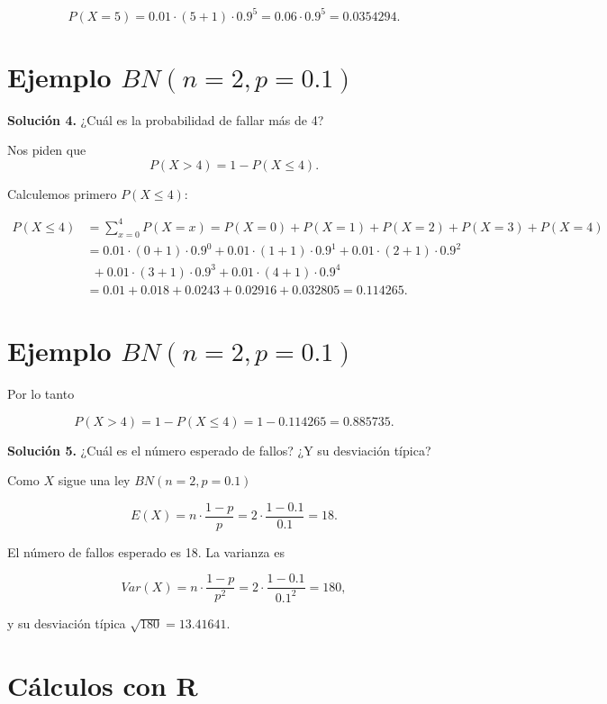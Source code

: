 \documentclass[
  letterpaper,
  DIV=11,
  numbers=noendperiod]{scrreprt}
\begin{document}
\[
P(X=5)= 0.01\cdot (5+1) \cdot 0.9^{5}= 0.06 \cdot 0.9^{5}= 0.0354294.
\]

\section{\texorpdfstring{Ejemplo
\(BN(n=2,p=0.1)\)}{Ejemplo BN(n=2,p=0.1)}}\label{ejemplo-bnn2p0.1-3}

\textbf{Solución 4.} ¿Cuál es la probabilidad de fallar más de 4?

Nos piden que\\
\[
P(X>4)=1-P(X\leq 4).
\]

Calculemos primero \(P(X\leq 4):\)

\[
\begin{array}{rl}
P(X\leq 4) &=  \displaystyle\sum_{x=0}^{4} P(X=x)=P(X=0)+P(X=1)+P(X=2)+P(X=3)+P(X=4)\\
&= 0.01\cdot (0+1) \cdot 0.9^{0}+0.01\cdot (1+1) \cdot 0.9^{1}+0.01\cdot (2+1) \cdot 0.9^{2} \\ &\ \ 
+0.01\cdot (3+1) \cdot 0.9^{3} + 0.01\cdot (4+1) \cdot 0.9^{4} \\ & =
0.01 +0.018+0.0243+0.02916+0.032805 = 0.114265.
\end{array}
\]

\section{\texorpdfstring{Ejemplo
\(BN(n=2,p=0.1)\)}{Ejemplo BN(n=2,p=0.1)}}\label{ejemplo-bnn2p0.1-4}

Por lo tanto

\[
P(X>4)=1-P(X\leq 4)=1-0.114265=
0.885735.
\]

\textbf{Solución 5.} ¿Cuál es el número esperado de fallos? ¿Y su
desviación típica?

Como \(X\) sigue una ley \(BN(n=2,p=0.1)\)

\[E(X)=n\cdot \frac{1-p}{p}=2\cdot \frac{1-0.1}{0.1}=18.\]

El número de fallos esperado es 18. La varianza es

\[
Var(X)=n\cdot\frac{1-p}{p^2}=2 \cdot \frac{1-0.1}{0.1^2}=180,
\]

y su desviación típica \(\sqrt{180}=13.41641.\)

\section{Cálculos con R}\label{cuxe1lculos-con-r-2}
\end{document}
